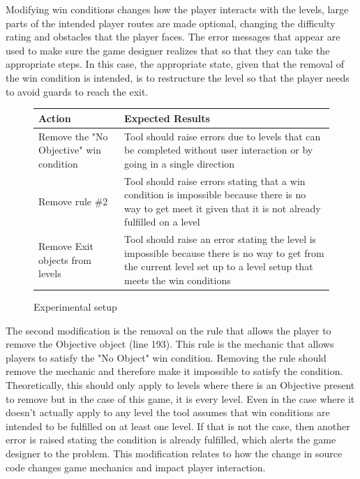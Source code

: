 Modifying win conditions changes how the player interacts with the levels, large parts of the intended player routes are made optional, changing the difficulty rating and obstacles that the player faces. The error messages that appear are used to make sure the game designer realizes that so that they can take the appropriate steps. In this case, the appropriate state, given that the removal of the win condition is intended, is to restructure the level so that the player needs to avoid guards to reach the exit.

\begin{figure}[!t]
    \centering
    \caption{Experimental setup}
    \begin{tabular}{p{4cm}|p{11cm}}
    \textbf{Action} & \textbf{Expected Results} \\ \hline
    Remove the "No Objective" win condition & Tool should raise errors due to levels that can be completed without user interaction or by going in a single direction \\ \hline
    Remove rule \#2 & Tool should raise errors stating that a win condition is impossible because there is no way to get meet it given that it is not already fulfilled on a level \\ \hline
    Remove Exit objects from levels & Tool should raise an error stating the level is impossible because there is no way to get from the current level set up to a level setup that meets the win conditions \\ \hline
    \end{tabular}
    \label{fig:case_study_experiment_old}
\end{figure}


The second modification is the removal on the rule that allows the player to remove the Objective object (line 193). This rule is the mechanic that allows players to satisfy the "No Object" win condition. Removing the rule should remove the mechanic and therefore make it impossible to satisfy the condition. Theoretically, this should only apply to levels where there is an Objective present to remove but in the case of this game, it is every level. Even in the case where it doesn't actually apply to any level the tool assumes that win conditions are intended to be fulfilled on at least one level. If that is not the case, then another error is raised stating the condition is already fulfilled, which alerts the game designer to the problem. This modification relates to how the change in source code changes game mechanics and impact player interaction.

